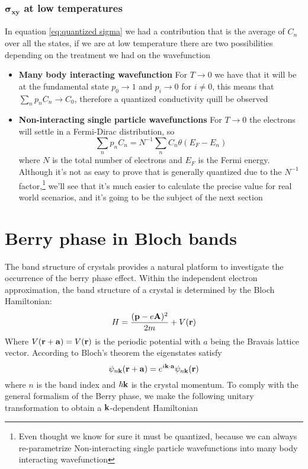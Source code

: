 \subsubsection*{$\boldsymbol{\sigma_{xy}}$ at low temperatures}
In equation \ref{eq:quantized sigma} we had a contribution that is the average of $C_n$ over all the states, if we are at low temperature there are two possibilities depending on the treatment we had on the wavefunction
\begin{itemize}
    \item \textbf{Many body interacting wavefunction} For $T\to 0$ we have that it will be at the fundamental state $p_0\to1$ and $p_i\to 0$ for $i\neq 0$, this means that $\sum_np_nC_n\to C_0$, therefore a quantized conductivity quill be observed
    \item \textbf{Non-interacting single particle wavefunctions} For $T\to 0$ the electrons will settle in a Fermi-Dirac distribution, so \[\sum_np_nC_n=N^{-1}\sum_nC_n\theta(E_F-E_n)\] where $N$ is the total number of electrons and $E_F$ is the Fermi energy. Although it's not as easy to prove that is generally quantized due to the $N^{-1}$ factor,\footnote{Even thought we know for sure it must be quantized, because we can always re-parametrize Non-interacting single particle wavefunctions into many body interacting wavefunction} we'll see that it's much easier to calculate the precise value for real world scenarios, and it's going to be the subject of the next section
\end{itemize}



















\section{Berry phase in Bloch bands}
The band structure of crystals provides a natural platform to investigate the occurrence of the berry phase effect. Within the independent electron approximation, the band structure of a crystal is determined by the Bloch Hamiltonian:
\begin{equation}
    H= \frac {(\mathbf{p} -e\mathbf{A})^2}{2m} + V(\mathbf{r})
\end{equation}
Where $V(\mathbf{r}+\mathbf{a})=V(\mathbf{r})$ is the periodic potential with $a$ being the Bravais lattice vector. According to Bloch's theorem the eigenstates satisfy 
\begin{equation}
    \psi_{n\mathbf{k}}(\mathbf{r}+\mathbf{a})=e^{i\mathbf{k}\cdot \mathbf{a}}\psi_{n\mathbf{k}}(\mathbf{r})
\end{equation}
where $n$ is the band index and $\hbar \mathbf{k}$ is the crystal momentum. To comply with the general formalism of the Berry phase, we make the following unitary transformation to obtain a $\mathbf{k}$-dependent Hamiltonian

